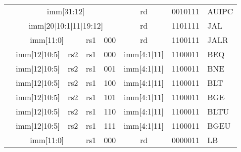 \begin{table}[p]
\begin{small}
\begin{center}
\begin{tabular}{p{0in}p{0.4in}p{0.05in}p{0.05in}p{0.05in}p{0.05in}p{0.4in}p{0.6in}p{0.4in}p{0.6in}p{0.7in}l}
&
\multicolumn{8}{|c|}{imm[31:12]} &
\multicolumn{1}{c|}{rd} &
\multicolumn{1}{c|}{0010111} & AUIPC \\
\cline{2-11}


&
\multicolumn{8}{|c|}{imm[20$\vert$10:1$\vert$11$\vert$19:12]} &
\multicolumn{1}{c|}{rd} &
\multicolumn{1}{c|}{1101111} & JAL \\
\cline{2-11}


&
\multicolumn{6}{|c|}{imm[11:0]} &
\multicolumn{1}{c|}{rs1} &
\multicolumn{1}{c|}{000} &
\multicolumn{1}{c|}{rd} &
\multicolumn{1}{c|}{1100111} & JALR \\
\cline{2-11}


&
\multicolumn{4}{|c|}{imm[12$\vert$10:5]} &
\multicolumn{2}{c|}{rs2} &
\multicolumn{1}{c|}{rs1} &
\multicolumn{1}{c|}{000} &
\multicolumn{1}{c|}{imm[4:1$\vert$11]} &
\multicolumn{1}{c|}{1100011} & BEQ \\
\cline{2-11}


&
\multicolumn{4}{|c|}{imm[12$\vert$10:5]} &
\multicolumn{2}{c|}{rs2} &
\multicolumn{1}{c|}{rs1} &
\multicolumn{1}{c|}{001} &
\multicolumn{1}{c|}{imm[4:1$\vert$11]} &
\multicolumn{1}{c|}{1100011} & BNE \\
\cline{2-11}


&
\multicolumn{4}{|c|}{imm[12$\vert$10:5]} &
\multicolumn{2}{c|}{rs2} &
\multicolumn{1}{c|}{rs1} &
\multicolumn{1}{c|}{100} &
\multicolumn{1}{c|}{imm[4:1$\vert$11]} &
\multicolumn{1}{c|}{1100011} & BLT \\
\cline{2-11}


&
\multicolumn{4}{|c|}{imm[12$\vert$10:5]} &
\multicolumn{2}{c|}{rs2} &
\multicolumn{1}{c|}{rs1} &
\multicolumn{1}{c|}{101} &
\multicolumn{1}{c|}{imm[4:1$\vert$11]} &
\multicolumn{1}{c|}{1100011} & BGE \\
\cline{2-11}


&
\multicolumn{4}{|c|}{imm[12$\vert$10:5]} &
\multicolumn{2}{c|}{rs2} &
\multicolumn{1}{c|}{rs1} &
\multicolumn{1}{c|}{110} &
\multicolumn{1}{c|}{imm[4:1$\vert$11]} &
\multicolumn{1}{c|}{1100011} & BLTU \\
\cline{2-11}


&
\multicolumn{4}{|c|}{imm[12$\vert$10:5]} &
\multicolumn{2}{c|}{rs2} &
\multicolumn{1}{c|}{rs1} &
\multicolumn{1}{c|}{111} &
\multicolumn{1}{c|}{imm[4:1$\vert$11]} &
\multicolumn{1}{c|}{1100011} & BGEU \\
\cline{2-11}


&
\multicolumn{6}{|c|}{imm[11:0]} &
\multicolumn{1}{c|}{rs1} &
\multicolumn{1}{c|}{000} &
\multicolumn{1}{c|}{rd} &
\multicolumn{1}{c|}{0000011} & LB \\
\cline{2-11}



\end{tabular}
\end{center}
\end{small}
\end{table}
